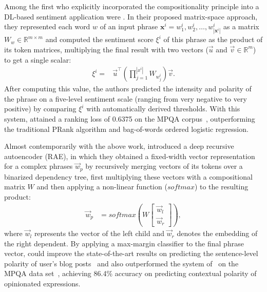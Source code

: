 Among the first who explicitly incorporated the compositionality
principle into a DL-based sentiment application were
\citet{Yessenalina:11}.  In their proposed matrix-space approach, they
represented each word $w$ of an input phrase $\mathbf{x}^i = w^i_1,
w^i_2, \ldots, w^i_{|\mathbf{x}^i|}$ as a matrix
$W_{w}\in\mathbb{R}^{m\times m}$ and computed the sentiment score
$\xi^i$ of this phrase as the product of its token matrices,
multiplying the final result with two vectors ($\vec{u}$ and
$\vec{v}\in\mathbb{R}^m$) to get a single scalar:
\begin{align*}
  \xi^i =& \vec{u}^\top\left(\prod_{j=1}^{|x^i|}W_{w^i_j}\right)\vec{v}.
\end{align*}
After computing this value, the authors predicted the intensity and
polarity of the phrase on a five-level sentiment scale (ranging from
very negative to very positive) by comparing $\xi^i$ with
automatically derived thresholds.  With this system,
\citeauthor{Yessenalina:11} attained a ranking loss of 0.6375 on the
MPQA corpus~\cite{Wiebe:05}, outperforming the traditional PRank
algorithm \cite{Crammer:01} and bag-of-words ordered logistic
regression.

Almost contemporarily with the above work, \citet{Socher:11}
introduced a deep recursive autoencoder (RAE), in which they obtained
a fixed-width vector representation for a complex phrases $\vec{w}_p$
by recursively merging vectors of its tokens over a binarized
dependency tree, first multiplying these vectors with a compositional
matrix $W$ and then applying a non-linear function ($softmax$) to the
resulting product:
\begin{align}
  \vec{w}_p &= softmax\left(W\begin{bmatrix}
      \vec{w}_l\\
      \vec{w}_r
  \end{bmatrix}\right),\label{cgsa:eq:socher-11}
\end{align}
where $\vec{w}_l$ represents the vector of the left child and
$\vec{w}_r$ denotes the embedding of the right dependent.  By applying
a max-margin classifier to the final phrase vector, \citet{Socher:11}
could improve the state-of-the-art results on predicting the
sentence-level polarity of user's blog posts~\cite{Potts:10} and also
outperformed the system of~\citet{Nasukawa:03} on the MPQA data
set~\cite{Wiebe:05}, achieving 86.4\% accuracy on predicting
contextual polarity of opinionated expressions.


